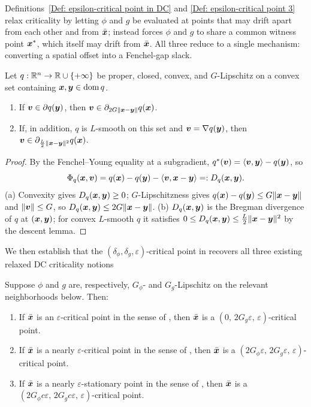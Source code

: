 Definitions~\ref{Def: epsilon-critical point in DC} and
\ref{Def: epsilon-critical point 3} relax criticality by letting $\phi$
and $g$ be evaluated at points that may drift apart from each other and
from $\bar{\bm{x}}$;  instead forces $\phi$ and
$g$ to share a common witness point $\bm{x}^*$, which itself may drift from
$\bar{\bm{x}}$. All three reduce to a single mechanism: converting a spatial
offset into a Fenchel-gap slack.

\begin{lemma}
\label{lem:spatial-to-value}
Let $q:\mathbb{R}^n\to\mathbb{R}\cup\{+\infty\}$ be proper, closed, convex, and
$G$-Lipschitz on a convex set containing $\bm{x},\bm{y}\in\operatorname{dom}q$.
\begin{enumerate}
    \item[(a)] If $\bm{v}\in\partial q(\bm{y})$, then
    $\bm{v}\in\partial_{2G\|\bm{x}-\bm{y}\|}q(\bm{x})$.
    \item[(b)] If, in addition, $q$ is $L$-smooth on this set and
    $\bm{v}=\nabla q(\bm{y})$, then
    $\bm{v}\in\partial_{\frac{L}{2}\|\bm{x}-\bm{y}\|^2}q(\bm{x})$.
\end{enumerate}
\end{lemma}

\begin{proof}
By the Fenchel--Young equality at a subgradient,
$q^*(\bm{v})=\langle\bm{v},\bm{y}\rangle-q(\bm{y})$, so
\[
    \Phi_q(\bm{x},\bm{v})
    = q(\bm{x})-q(\bm{y})-\langle\bm{v},\bm{x}-\bm{y}\rangle
    =: D_q(\bm{x},\bm{y}).
\]
(a) Convexity gives $D_q(\bm{x},\bm{y})\ge0$; $G$-Lipschitzness gives
$q(\bm{x})-q(\bm{y})\le G\|\bm{x}-\bm{y}\|$ and $\|\bm{v}\|\le G$, so
$D_q(\bm{x},\bm{y})\le 2G\|\bm{x}-\bm{y}\|$.
(b) $D_q(\bm{x},\bm{y})$ is the Bregman divergence of $q$ at $(\bm{x},\bm{y})$; for
convex $L$-smooth $q$ it satisfies $0\le D_q(\bm{x},\bm{y})\le\tfrac
L2\|\bm{x}-\bm{y}\|^2$ by the descent lemma.
\end{proof}
We then establish that the $(\delta_\phi,\delta_g,\varepsilon)$-critical point in  recovers all three existing relaxed DC criticality notions
\begin{proposition}
\label{prop:recovery-existing-dc-criticality}
Suppose $\phi$ and $g$ are, respectively, $G_\phi$- and $G_g$-Lipschitz on
the relevant neighborhoods below. Then:
\begin{enumerate}
    \item[(i)] If $\bar{\bm{x}}$ is an $\varepsilon$-critical point in the
    sense of , then $\bar{\bm{x}}$ is a
    $(0,\,2G_g\varepsilon,\,\varepsilon)$-critical point.
    \item[(ii)] If $\bar{\bm{x}}$ is a nearly $\varepsilon$-critical point in
    the sense of , then $\bar{\bm{x}}$ is a
    $(2G_\phi\varepsilon,\,2G_g\varepsilon,\,\varepsilon)$-critical point.
    \item[(iii)] If $\bar{\bm{x}}$ is a nearly $\varepsilon$-stationary point in
    the sense of , then $\bar{\bm{x}}$ is a
    $(2G_\phi c\varepsilon,\,2G_g c\varepsilon,\,\varepsilon)$-critical
    point.
\end{enumerate}
\end{proposition}

